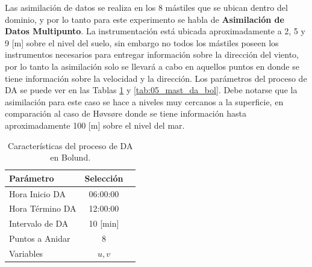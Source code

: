 Las asimilación de datos se realiza en los 8 mástiles que se ubican dentro del dominio, y por lo tanto para este experimento se habla de \textbf{Asimilación de Datos Multipunto}. La instrumentación está ubicada aproximadamente a 2, 5 y 9 [m] sobre el nivel del suelo, sin embargo no todos los mástiles poseen los instrumentos necesarios para entregar información sobre la dirección del viento, por lo tanto la asimilación solo se llevará a cabo en aquellos puntos en donde se tiene información sobre la velocidad y la dirección. Los parámetros del proceso de DA se puede ver en las Tablas \ref{tab:05_config_da_bol} y \ref{tab:05_mast_da_bol}. Debe notarse que la asimilación para este caso se hace a niveles muy cercanos a la superficie, en comparación al caso de Høvsøre donde se tiene información hasta aproximadamente 100 [m] sobre el nivel del mar.

\begin{table}[h!]
	\caption{Características del proceso de DA en Bolund.}\label{tab:05_config_da_bol}
	\centering\footnotesize
	\begin{tabular}{lcc}
		\toprule
		Parámetro & Selección \\
		\midrule
		Hora Inicio	DA 	 & 06:00:00   \\
		Hora Término DA	 		 & 12:00:00  \\
		Intervalo de DA	&	10 [min] \\
		Puntos a Anidar	 	 & 8   \\
		Variables	& $u,v$   \\
		\bottomrule
	\end{tabular}
\end{table}

\begin{table}[H]
	\caption{Detalle de la asimilación en cada mástil en Bolund.}\label{tab:05_mast_da_bol}
	\centering\footnotesize{}
\end{table}

